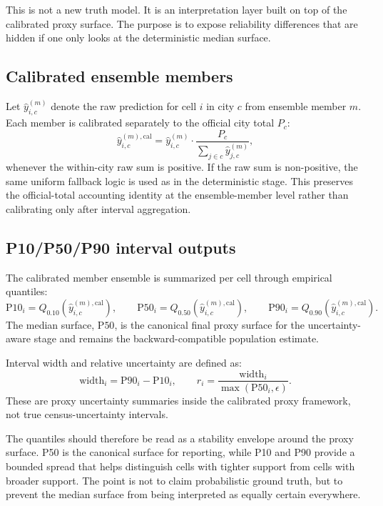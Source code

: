 This is not a new truth model. It is an interpretation layer built on top of the calibrated proxy surface. The purpose is to expose reliability differences that are hidden if one only looks at the deterministic median surface.

\subsection{Calibrated ensemble members}

Let $\hat{y}^{(m)}_{i,c}$ denote the raw prediction for cell $i$ in city $c$ from ensemble member $m$. Each member is calibrated separately to the official city total $P_c$:
\[
\hat{y}^{(m),\mathrm{cal}}_{i,c}=
\hat{y}^{(m)}_{i,c}
\cdot
\frac{P_c}{\sum_{j \in c}\hat{y}^{(m)}_{j,c}},
\]
whenever the within-city raw sum is positive. If the raw sum is non-positive, the same uniform fallback logic is used as in the deterministic stage. This preserves the official-total accounting identity at the ensemble-member level rather than calibrating only after interval aggregation.

\subsection{P10/P50/P90 interval outputs}

The calibrated member ensemble is summarized per cell through empirical quantiles:
\[
\mathrm{P10}_i = Q_{0.10}\!\left(\hat{y}^{(m),\mathrm{cal}}_{i,c}\right), \qquad
\mathrm{P50}_i = Q_{0.50}\!\left(\hat{y}^{(m),\mathrm{cal}}_{i,c}\right), \qquad
\mathrm{P90}_i = Q_{0.90}\!\left(\hat{y}^{(m),\mathrm{cal}}_{i,c}\right).
\]
The median surface, $\mathrm{P50}$, is the canonical final proxy surface for the uncertainty-aware stage and remains the backward-compatible population estimate.

Interval width and relative uncertainty are defined as:
\[
\mathrm{width}_i = \mathrm{P90}_i - \mathrm{P10}_i,
\qquad
r_i = \frac{\mathrm{width}_i}{\max(\mathrm{P50}_i,\epsilon)}.
\]
These are proxy uncertainty summaries inside the calibrated proxy framework, not true census-uncertainty intervals.

The quantiles should therefore be read as a stability envelope around the proxy surface. P50 is the canonical surface for reporting, while P10 and P90 provide a bounded spread that helps distinguish cells with tighter support from cells with broader support. The point is not to claim probabilistic ground truth, but to prevent the median surface from being interpreted as equally certain everywhere.

